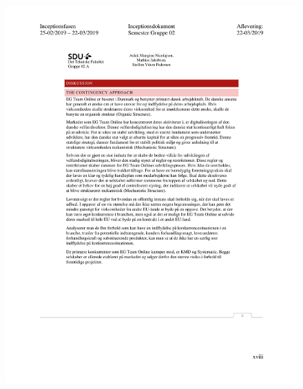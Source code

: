 \begin{figure}[hb]
  \includegraphics[scale = 0.33]{./PNG/Inceptions/Gruppe 02 + InceptionsDokument-51.jpg} 
\end{figure}

